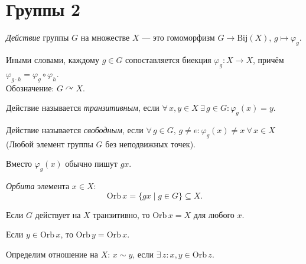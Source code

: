 \section{Группы 2}

\begin{definition}
    \emph{Действие} группы $G$ на множестве $X$ --- это гомоморфизм $G \to \mathrm{Bij}(X)$, $g \mapsto \varphi_g$.

    Иными словами, каждому $g \in G$ сопоставляется биекция $\varphi_g\colon X \to X$, причём $\varphi_{g \cdot h} = \varphi_g \circ \varphi_h$. \\
    Обозначение: $G \curvearrowright X$.
\end{definition}

\begin{definition}
    Действие называется \emph{транзитивным}, если $\forall\, x, y \in X\ \exists\, g \in G\colon \varphi_g(x) = y$.
\end{definition}

\begin{definition}
    Действие называется \emph{свободным}, если $\forall\, g \in G,\, g \neq e\colon \varphi_g(x) \neq x\ \forall\, x \in X$ 
    (Любой элемент группы $G$  без неподвижных точек).
\end{definition}


\begin{remark} 
    Вместо $\varphi_g(x)$ обычно пишут $gx$.
\end{remark}



\begin{definition}
    \emph{Орбита} элемента $x \in X$:
    \[
        \mathrm{Orb}\, x = \{gx \mid g \in G\} \subseteq X.
    \]
\end{definition}

\begin{example}
    Если $G$ действует на $X$ транзитивно, то $\mathrm{Orb}\, x = X$ для любого $x$.
\end{example}

\begin{stmt}
    Если $y \in \mathrm{Orb}\, x$, то $\mathrm{Orb}\, y = \mathrm{Orb}\, x$.
\end{stmt}

\begin{definition}
    Определим отношение на $X$: $x \sim y$, если $\exists\, z\colon x, y \in \mathrm{Orb}\, z$.
\end{definition}

